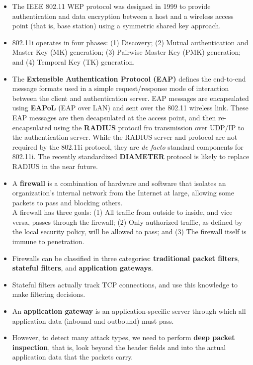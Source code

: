 \begin{itemize}
\item
The IEEE 802.11 WEP protocol was designed in 1999 to provide authentication and data encryption between a host and a wireless access point (that is, base station) using a symmetric shared key approach.

\item
802.11i operates in four phases: (1) Discovery; (2) Mutual authentication and Master Key (MK) generation; (3) Pairwise Master Key (PMK) generation; and (4) Temporal Key (TK) generation.

\item
The \textbf{Extensible Authentication Protocol (EAP)} defines the end-to-end message formats used in a simple request/response mode of interaction between the client and authentication server. EAP messages are encapsulated using \textbf{EAPoL} (EAP over LAN) and sent over the 802.11 wireless link. These EAP messages are then decapsulated at the access point, and then re-encapsulated using the \textbf{RADIUS} protocil fro transmission over UDP/IP to the authentication server. While the RADIUS server and protocol are not required by the 802.11i protocol, they are \textit{de facto} standard components for 802.11i. The recently standardized \textbf{DIAMETER} protocol is likely to replace RADIUS in the near future.

\item
A \textbf{firewall} is a combination of hardware and software that isolates an organization's internal network from the Internet at large, allowing some packets to pass and blocking others.\\
A firewall has three goals: (1) All traffic from outside to inside, and vice versa, passes through the firewall; (2) Only authorized traffic, as defined by the local security policy, will be allowed to pass; and (3) The firewall itself is immune to penetration.

\item
Firewalls can be classified in three categories: \textbf{traditional packet filters}, \textbf{stateful filters}, and \textbf{application gateways}.

\item
Stateful filters actually track TCP connections, and use this knowledge to make filtering decisions.

\item
An \textbf{application gateway} is an application-specific server through which all application data (inbound and outbound) must pass.

\item
However, to detect many attack types, we need to perform \textbf{deep packet inspection}, that is, look beyond the header fields and into the actual application data that the packets carry.


\end{itemize}
